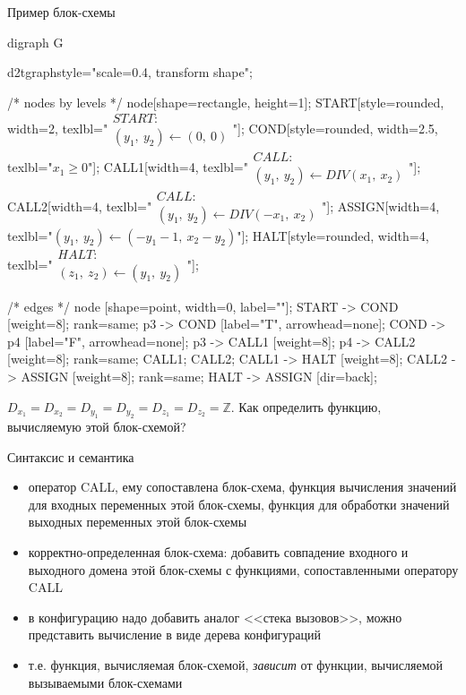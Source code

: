 \documentclass[hyperref={unicode=true}]{beamer}
\begin{document}
	\begin{frame}[fragile]{Пример блок-схемы}

	\huge
	\begin{dot2tex}[options=-traw]
	digraph G{
		d2tgraphstyle="scale=0.4, transform shape";

		/* nodes by levels */
		node[shape=rectangle, height=1];
		START[style=rounded, width=2, texlbl="$\begin{matrix}START:\\(y_1,~y_2) \leftarrow (0,~0)\end{matrix}$"];
        COND[style=rounded, width=2.5, texlbl="$x_1 \geq 0$"];
		CALL1[width=4, texlbl="$\begin{matrix}CALL:\\(y_1,~y_2) \leftarrow DIV(x_1,~x_2)\end{matrix}$"];
		CALL2[width=4, texlbl="$\begin{matrix}CALL:\\(y_1,~y_2) \leftarrow DIV(-x_1,~x_2)\end{matrix}$"];
		ASSIGN[width=4, texlbl="$(y_1,~y_2) \leftarrow (-y_1-1,~x_2 - y_2)$"];
        HALT[style=rounded, width=4, texlbl="$\begin{matrix}HALT:\\(z_1,~z_2) \leftarrow (y_1,~y_2)\end{matrix}$"];

		/* edges */
		node [shape=point, width=0, label=""];
		START -> COND [weight=8];
		{ rank=same; p3 -> COND [label="T", arrowhead=none]; COND -> p4 [label="F", arrowhead=none]; }
		p3 -> CALL1 [weight=8];
		p4 -> CALL2 [weight=8];
		{ rank=same; CALL1; CALL2; }
		CALL1 -> HALT [weight=8];
		CALL2 -> ASSIGN [weight=8];
		{ rank=same; HALT -> ASSIGN [dir=back]; }
        }
	\end{dot2tex}

	\normalsize

    $D_{x_1} = D_{x_2} = D_{y_1} = D_{y_2} = D_{z_1} = D_{z_2} = \mathbb{Z}$.
    Как определить функцию, вычисляемую этой блок-схемой?
	\end{frame}

    \begin{frame}{Синтаксис и семантика}
    \begin{itemize}
    \item оператор CALL, ему сопоставлена блок-схема, функция вычисления
    значений для входных переменных этой блок-схемы, функция для обработки
    значений выходных переменных этой блок-схемы
    \item корректно-определенная блок-схема: добавить совпадение
    входного и выходного домена этой блок-схемы с функциями, сопоставленными
    оператору CALL
    \item в конфигурацию надо добавить аналог <<стека вызовов>>, можно
    представить вычисление в виде дерева конфигураций
    \item т.е. функция, вычисляемая блок-схемой, \emph{зависит}
          от функции, вычисляемой вызываемыми блок-схемами
    \end{itemize}
    \end{frame}
\end{document}

